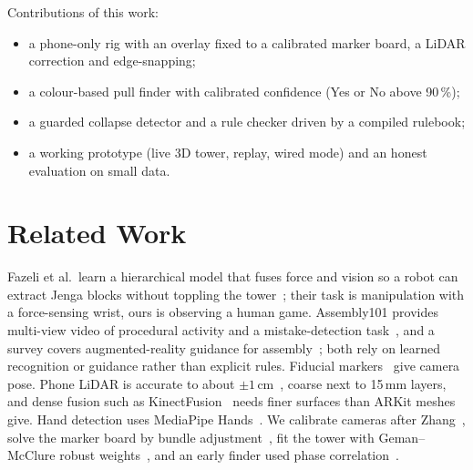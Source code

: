 \documentclass[12pt,a4paper]{article}
\begin{document}
Contributions of this work:
\begin{itemize}
\item a phone-only rig with an overlay fixed to a calibrated marker board, a LiDAR correction and edge-snapping;
\item a colour-based pull finder with calibrated confidence (Yes or No above 90\,\%);
\item a guarded collapse detector and a rule checker driven by a compiled rulebook;
\item a working prototype (live 3D tower, replay, wired mode) and an honest evaluation on small data.
\end{itemize}

\section{Related Work}
Fazeli et al.\ learn a hierarchical model that fuses force and vision so a robot can extract Jenga blocks without toppling the tower~\cite{fazeli}; their task is manipulation with a force-sensing wrist, ours is observing a human game. Assembly101 provides multi-view video of procedural activity and a mistake-detection task~\cite{sener}, and a survey covers augmented-reality guidance for assembly~\cite{wang}; both rely on learned recognition or guidance rather than explicit rules. Fiducial markers~\cite{garrido} give camera pose. Phone LiDAR is accurate to about $\pm1$\,cm~\cite{luetz}, coarse next to 15\,mm layers, and dense fusion such as KinectFusion~\cite{newcombe} needs finer surfaces than ARKit meshes give. Hand detection uses MediaPipe Hands~\cite{mediapipe}. We calibrate cameras after Zhang~\cite{zhang}, solve the marker board by bundle adjustment~\cite{triggs}, fit the tower with Geman--McClure robust weights~\cite{geman}, and an early finder used phase correlation~\cite{kuglin}.
\end{document}
